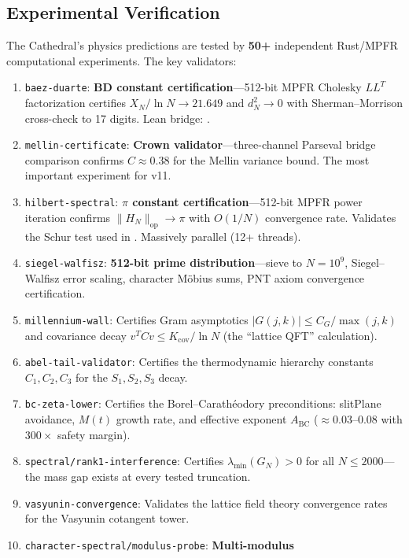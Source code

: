 \documentclass[11pt,a4paper]{article}
\begin{document}
\subsection{Experimental Verification}

The Cathedral's physics predictions are tested by \textbf{50+} independent
Rust/MPFR computational experiments. The key validators:
\begin{enumerate}
  \item \texttt{baez-duarte}: \textbf{BD constant certification}---512-bit
    MPFR Cholesky $LL^T$ factorization certifies $X_N/\ln N \to 21.649$
    and $d_N^2 \to 0$ with Sherman--Morrison cross-check to 17 digits.
    Lean bridge: .
  \item \texttt{mellin-certificate}: \textbf{Crown validator}---three-channel
    Parseval bridge comparison confirms $C \approx 0.38$ for the Mellin
    variance bound. The most important experiment for v11.
  \item \texttt{hilbert-spectral}: \textbf{$\pi$ constant certification}---512-bit
    MPFR power iteration confirms $\|H_N\|_{\mathrm{op}} \to \pi$ with
    $O(1/N)$ convergence rate. Validates the Schur test used in
    . Massively parallel (12+ threads).
  \item \texttt{siegel-walfisz}: \textbf{512-bit prime distribution}---sieve
    to $N = 10^9$, Siegel--Walfisz error scaling, character M\"obius sums,
    PNT axiom convergence certification.
  \item \texttt{millennium-wall}: Certifies Gram asymptotics
    $|G(j,k)| \leq C_G/\max(j,k)$ and covariance decay
    $v^T C v \leq K_{\mathrm{cov}}/\ln N$ (the ``lattice QFT'' calculation).
  \item \texttt{abel-tail-validator}: Certifies the thermodynamic
    hierarchy constants $C_1, C_2, C_3$ for the $S_1, S_2, S_3$ decay.
  \item \texttt{bc-zeta-lower}: Certifies the Borel--Carath\'eodory
    preconditions: slitPlane avoidance, $M(t)$ growth rate, and
    effective exponent $A_{\mathrm{BC}}$ ($\approx 0.03$--$0.08$ with
    $300\times$ safety margin).
  \item \texttt{spectral/rank1-interference}: Certifies
    $\lambda_{\min}(G_N) > 0$ for all $N \leq 2000$---the mass gap
    exists at every tested truncation.
  \item \texttt{vasyunin-convergence}: Validates the lattice field theory
    convergence rates for the Vasyunin cotangent tower.
  \item \texttt{character-spectral/modulus-probe}: \textbf{Multi-modulus
}
\end{enumerate}
\end{document}
